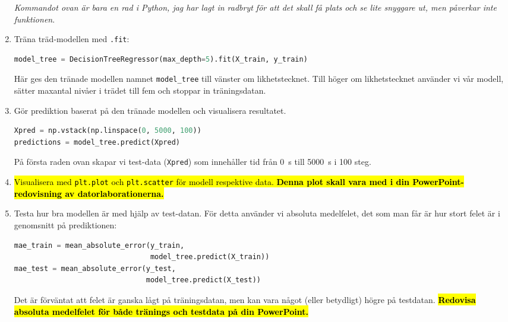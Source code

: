 \documentclass{article}
\begin{document}
\begin{enumerate}
    \emph{Kommandot ovan är bara en rad i Python, jag har lagt in radbryt för att det skall få plats och se lite snyggare ut, men påverkar inte funktionen}.
    \item Träna träd-modellen med \texttt{.fit}:
    \begin{lstlisting}[language=Python]
model_tree = DecisionTreeRegressor(max_depth=5).fit(X_train, y_train)        
\end{lstlisting}
    Här ges den tränade modellen namnet \texttt{model\_tree} till vänster om likhetstecknet. Till höger om likhetstecknet använder vi vår modell, sätter maxantal nivåer i trädet till fem och stoppar in träningsdatan.
    \item Gör prediktion baserat på den tränade modellen och visualisera resultatet.
    \begin{lstlisting}[language=Python]
Xpred = np.vstack(np.linspace(0, 5000, 100))
predictions = model_tree.predict(Xpred)        
\end{lstlisting}
    På första raden ovan skapar vi test-data (\texttt{Xpred}) som innehåller tid från \qty{0}{\s} till \qty{5000}{\s} i 100 steg.
    \item \hl{Visualisera med \texttt{plt.plot} och \texttt{plt.scatter} för modell respektive data. \textbf{Denna plot skall vara med i din PowerPoint-redovisning av datorlaborationerna.}}
    \item Testa hur bra modellen är med hjälp av test-datan. För detta använder vi absoluta medelfelet, det som man får är hur stort felet är i genomsnitt på prediktionen:
    \begin{lstlisting}[language=Python]
mae_train = mean_absolute_error(y_train,
                                model_tree.predict(X_train))
mae_test = mean_absolute_error(y_test,
                               model_tree.predict(X_test))
\end{lstlisting}
    Det är förväntat att felet är ganska lågt på träningsdatan, men kan vara något (eller betydligt) högre på testdatan.
    \hl{\textbf{Redovisa absoluta medelfelet för både tränings och testdata på din PowerPoint.}}
\end{enumerate}
\end{document}
